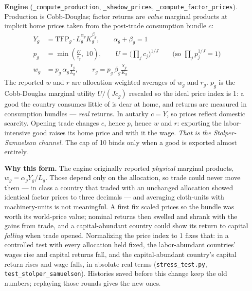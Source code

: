 \documentclass[11pt]{article}
\newcommand{\code}[1]{\texttt{#1}}
\begin{document}
\textbf{Engine} (\code{\_compute\_production}, \code{\_shadow\_prices},
\code{\_compute\_factor\_prices}). Production is Cobb-Douglas; factor returns are
\emph{value} marginal products at implicit home prices taken from the
post-trade consumption bundle $c$:
\begin{align*}
Y_g &= \mathrm{TFP}_g \cdot L_g^{\alpha_g} K_g^{\beta_g}, \qquad \alpha_g + \beta_g = 1 \\
p_g &= \min\!\left(\frac{U}{c_g},\; 10\right), \qquad
  U = \Big(\prod_{j} c_j\Big)^{1/J}
  \qquad \text{(so } \textstyle\prod_j p_j^{1/J} = 1\text{)} \\
w_g &= p_g\,\alpha_g \frac{Y_g}{L_g}, \qquad
r_g = p_g\,\beta_g \frac{Y_g}{K_g}
\end{align*}
The reported $w$ and $r$ are allocation-weighted averages of $w_g$ and $r_g$.
$p_g$ is the Cobb-Douglas marginal utility $U/(Jc_g)$ rescaled so the ideal price
index is 1: a good the country consumes little of is dear at home, and returns
are measured in consumption bundles --- \emph{real} returns. In autarky $c = Y$,
so prices reflect domestic scarcity. Opening trade changes $c$, hence $p$, hence
$w$ and $r$: exporting the labor-intensive good raises its home price and with
it the wage. \emph{That is the Stolper-Samuelson channel.} The cap of 10 binds
only when a good is exported almost entirely.

\textbf{Why this form.} The engine originally reported \emph{physical} marginal
products, $w_g = \alpha_g Y_g / L_g$. Those depend only on the allocation, so
trade could never move them --- in class a country that traded with an unchanged
allocation showed identical factor prices to three decimals --- and averaging
cloth-units with machinery-units is not meaningful. A first fix scaled prices so
the bundle was worth its world-price value; nominal returns then swelled and
shrank with the gains from trade, and a capital-abundant country could show its
return to capital \emph{falling} when trade opened. Normalizing the price index
to 1 fixes that: in a controlled test with every allocation held fixed, the
labor-abundant countries' wages rise and capital returns fall, and the
capital-abundant country's capital return rises and wage falls, in absolute
real terms (\code{stress\_test.py}, \code{test\_stolper\_samuelson}). Histories
saved before this change keep the old numbers; replaying those rounds gives the
new ones.
\end{document}
